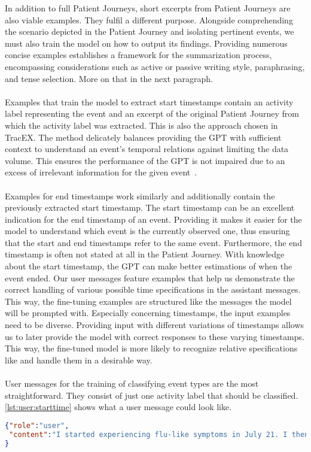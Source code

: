 In addition to full Patient Journeys, short excerpts from Patient Journeys are also viable examples. They fulfil a different purpose. Alongside comprehending the scenario depicted in the Patient Journey and isolating pertinent events, we must also train the model on how to output its findings. Providing numerous concise examples establishes a framework for the summarization process, encompassing considerations such as active or passive writing style, paraphrasing, and tense selection. More on that in the next paragraph.\\\\
Examples that train the model to extract start timestamps contain an activity label representing the event and an excerpt of the original Patient Journey from which the activity label was extracted. This is also the approach chosen in TracEX. The method delicately balances providing the GPT with sufficient context to understand an event's temporal relations against limiting the data volume. This ensures the performance of the GPT is not impaired due to an excess of irrelevant information for the given event~\cite{han_is_2023}.\\\\
Examples for end timestamps work similarly and additionally contain the previously extracted start timestamp. The start timestamp can be an excellent indication for the end timestamp of an event. Providing it makes it easier for the model to understand which event is the currently observed one, thus ensuring that the start and end timestamps refer to the same event. Furthermore, the end timestamp is often not stated at all in the Patient Journey. With knowledge about the start timestamp, the GPT can make better estimations of when the event ended. Our user messages feature examples that help us demonstrate the correct handling of various possible time specifications in the assistant messages.\\
This way, the fine-tuning examples are structured like the messages the model will be prompted with. Especially concerning timestamps, the input examples need to be diverse. Providing input with different variations of timestamps allows us to later provide the model with correct responses to these varying timestamps. This way, the fine-tuned model is more likely to recognize relative specifications like  and handle them in a desirable way. \\\\
User messages for the training of classifying event types are the most straightforward. They consist of just one activity label that should be classified.\\
\autoref{lst:user:starttime} shows what a user message could look like.
\begin{lstlisting}[language=json, caption={User message for determining an activities start timestamp}, label={lst:user:starttime}, float=ht]
{"role":"user",
 "content":"I started experiencing flu-like symptoms in July 21. I then got tested positive for Covid-19. In October, I got infected again. Then on the 4th of November I got my first dosage of the vaccine. I had heavy side effects. Activity Label: starting to experience symptoms"
}
\end{lstlisting}

